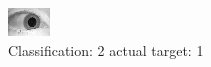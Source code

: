 \begin{figure}[h!]
\begin{center}
\includegraphics[width=0.60\columnwidth]{figures/ID1535_class_2_target_1.png}
\end{center}
\caption{ Classification: 2 actual target: 1}
\label{fig:ID1535_class_2_target_1}
\end{figure}
